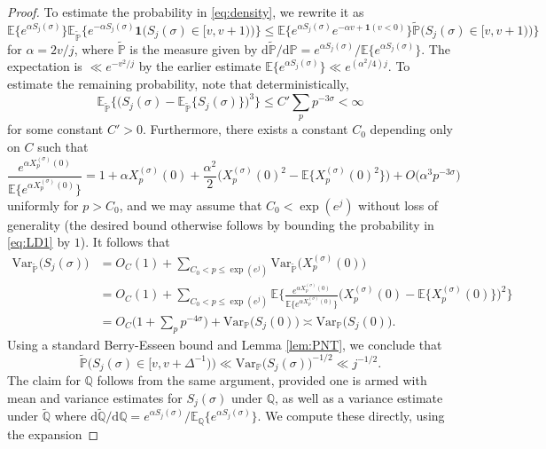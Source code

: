 \documentclass[10pt,a4paper]{amsart}
\begin{document}
\begin{proof}
To estimate the probability in \eqref{eq:density}, we rewrite it as
\begin{equation}\label{eq:LD1}
    \mathbb{E}\big\{e^{\alpha S_j(\sigma)}\big\} \mathbb{E}_{\tilde{\mathbb{\mathbb{P}}}}\big\{e^{-\alpha S_j(\sigma)}\mathbf{1}\big(S_{j}(\sigma)\in [v,v+1)\big)\big\} \leq \mathbb{E}\big\{e^{\alpha S_j(\sigma)}e^{-\alpha v+\mathbf{1}(v<0)}\big\}\tilde{\mathbb{\mathbb{P}}}\big(S_{j}(\sigma)\in [v,v+1)\big)\big\}
\end{equation}
for $\alpha=2v/j$, where $\tilde{\mathbb{\mathbb{P}}}$ is the measure given by $\mathrm{d}\tilde{\mathbb{\mathbb{P}}}/{\mathrm{d}\mathbb{P}}={e^{\alpha S_{j}(\sigma)}}/{\mathbb{E}\{e^{\alpha S_{j}(\sigma)}}\}$. The expectation is $\ll e^{-v^2/j}$ by the earlier estimate $\mathbb{E}\{e^{\alpha S_j(\sigma)}\}\ll e^{(\alpha^2/4)j}$. To estimate the remaining probability, note that deterministically,
\[  
    \mathbb{E}_{\tilde{\mathbb{P}}}\Big\{\Big(S_j(\sigma)-\mathbb{E}_{\tilde{\mathbb{P}}}\big\{S_j(\sigma)\big\}\Big)^3\Big\}\leq C'\sum_{p} p^{-3\sigma} <\infty
\]
for some constant $C'>0$. Furthermore, there exists a constant $C_0$ depending only on $C$ such that 
\[  
    \frac{e^{\alpha X_p^{(\sigma)}(0)}}{\mathbb{E}\big\{e^{\alpha X_p^{(\sigma)}(0)}\big\}}=1+\alpha X_p^{(\sigma)}(0)+\frac{\alpha^2}{2}\Big(X_p^{(\sigma)}(0)^2-\mathbb{E}\big\{X_p^{(\sigma)}(0)^2\big\}\Big)+O(\alpha^3p^{-3\sigma}\big)
\]
uniformly for $p>C_0$, and we may assume that $C_0<\exp(e^j)$ without loss of generality (the desired bound otherwise follows by bounding the probability in \eqref{eq:LD1} by $1$). It follows that
\begin{align*}
    \mathrm{Var}_{\tilde{\mathbb{P}}}\big(S_j(\sigma)\big) &= O_C(1)+ \sum_{C_0<p\leq \exp(e^j)} \mathrm{Var}_{\tilde{\mathbb{P}}}\big(X_p^{(\sigma)}(0)\big) \\
    &= O_C(1)+\sum_{C_0<p\leq \exp(e^j)}\mathbb{E}\bigg\{\frac{e^{\alpha X_p^{(\sigma)}(0)}}{\mathbb{E}\big\{e^{\alpha X_p^{(\sigma)}(0)}\big\}}\Big(X_p^{(\sigma)}(0)-\mathbb{E}\big\{X_p^{(\sigma)}(0)\big\}\Big)^2\bigg\}\\
    &= O_C\big(1+\sum_p p^{-4\sigma}\big)+\mathrm{Var}_{\mathbb{P}}\big(S_j(0)\big) \asymp \mathrm{Var}_{\mathbb{P}}\big(S_j(0)\big).
\end{align*}
Using a standard Berry-Esseen bound and Lemma \ref{lem:PNT}, we conclude that
\[
    \tilde{\mathbb{\mathbb{P}}}\big(S_{j}(\sigma)\in [v,v+\Delta^{-1})\big)\ll \mathrm{Var}_{{\mathbb{P}}}\big(S_j(\sigma)\big)^{-1/2}\ll j^{-1/2}.
\]
The claim for $\mathbb{Q}$ follows from the same argument, provided one is armed with mean and variance estimates for $S_j(\sigma)$ under $\mathbb{Q}$, as well as a variance estimate under $\tilde{\mathbb{Q}}$ where $\mathrm{d}\tilde{\mathbb{\mathbb{Q}}}/{\mathrm{d}\mathbb{Q}}={e^{\alpha S_{j}(\sigma)}}/{\mathbb{E}_{\mathbb{Q}}\big\{e^{\alpha S_{j}(\sigma)}}\big\}$. We compute these directly, using the expansion

\end{proof}
\end{document}
